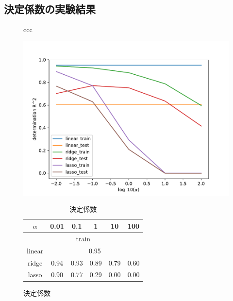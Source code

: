 \documentclass[dvipdfmx, 10pt]{beamer}
\begin{document}
\subsection{決定係数の実験結果}
    \begin{frame}{\insertsubsection}
       \begin{figure}[H]
        \begin{tabular}{ccc}
    	 \begin{minipage}{0.4\hsize}
                    	\includegraphics[width=1.0\linewidth]{../img/score.pdf}
                    	\caption{決定係数}
                   	\label{fig:score}
              \end{minipage}
    	 \begin{minipage}{0.6\hsize}
                	 \begin{table}[H]
                        	\centering
                        	\caption{決定係数}
                                	\begin{tabular}{|c|c|c|c|c|c|}
                        		\hline
                                		$\alpha$ & 0.01 & 0.1 & 1 & 10 & 100\\ 
                        		\hline
                        		\hline
                        		\multicolumn{6}{|c|}{train} \\
                        		\hline
                        		linear & \multicolumn{5}{|c|}{0.95} \\
                        		\hline
                        		ridge & 0.94 & 0.93 & 0.89 & 0.79 & 0.60 \\
                        		\hline
                        		lasso & 0.90 & 0.77 & 0.29 & 0.00 & 0.00\\

\end{tabular}
\end{table}
\end{minipage}
\end{tabular}
\end{figure}
\end{frame}
\end{document}

